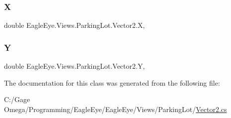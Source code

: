 \subsubsection{\texorpdfstring{X}{X}}
{\footnotesize\ttfamily double Eagle\+Eye.\+Views.\+Parking\+Lot.\+Vector2.\+X\hspace{0.3cm}{\ttfamily [get]}, {\ttfamily [set]}}

\mbox{\label{class_eagle_eye_1_1_views_1_1_parking_lot_1_1_vector2_aac35e7838fd7858b43c98df7e7d3c483}} 
\subsubsection{\texorpdfstring{Y}{Y}}
{\footnotesize\ttfamily double Eagle\+Eye.\+Views.\+Parking\+Lot.\+Vector2.\+Y\hspace{0.3cm}{\ttfamily [get]}, {\ttfamily [set]}}



The documentation for this class was generated from the following file\+:\begin{DoxyCompactItemize}
\item 
C\+:/\+Gage Omega/\+Programming/\+Eagle\+Eye/\+Eagle\+Eye/\+Views/\+Parking\+Lot/\mbox{\hyperlink{_views_2_parking_lot_2_vector2_8cs}{Vector2.\+cs}}\end{DoxyCompactItemize}
